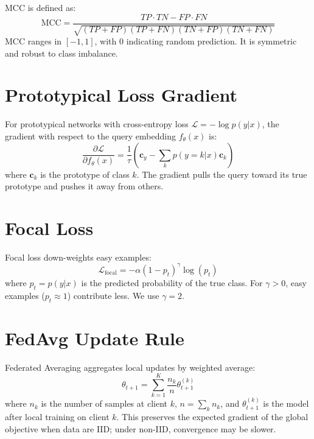MCC is defined as:
\begin{equation}
\text{MCC} = \frac{TP \cdot TN - FP \cdot FN}{\sqrt{(TP+FP)(TP+FN)(TN+FP)(TN+FN)}}
\end{equation}
MCC ranges in $[-1, 1]$, with 0 indicating random prediction. It is symmetric and robust to class imbalance.

\section{Prototypical Loss Gradient}

For prototypical networks with cross-entropy loss $\mathcal{L} = -\log p(y|x)$, the gradient with respect to the query embedding $f_\theta(x)$ is:
\begin{equation}
\frac{\partial \mathcal{L}}{\partial f_\theta(x)} = \frac{1}{\tau} \left( \mathbf{c}_{y} - \sum_{k} p(y=k|x) \mathbf{c}_k \right)
\end{equation}
where $\mathbf{c}_k$ is the prototype of class $k$. The gradient pulls the query toward its true prototype and pushes it away from others.

\section{Focal Loss}

Focal loss down-weights easy examples:
\begin{equation}
\mathcal{L}_{\text{focal}} = -\alpha (1-p_t)^\gamma \log(p_t)
\end{equation}
where $p_t = p(y|x)$ is the predicted probability of the true class. For $\gamma > 0$, easy examples ($p_t \approx 1$) contribute less. We use $\gamma = 2$.

\section{FedAvg Update Rule}

Federated Averaging aggregates local updates by weighted average:
\begin{equation}
\theta_{t+1} = \sum_{k=1}^{K} \frac{n_k}{n} \theta_{t+1}^{(k)}
\end{equation}
where $n_k$ is the number of samples at client $k$, $n = \sum_k n_k$, and $\theta_{t+1}^{(k)}$ is the model after local training on client $k$. This preserves the expected gradient of the global objective when data are IID; under non-IID, convergence may be slower.

